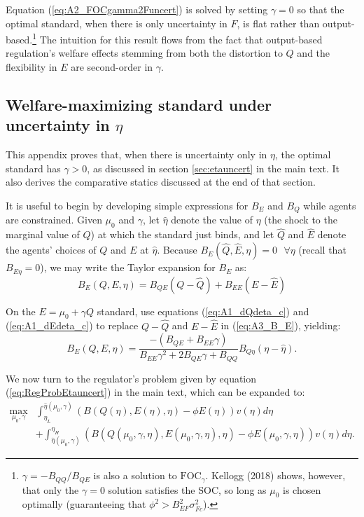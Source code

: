 \documentclass[12pt]{article}
\begin{document}
Equation (\ref{eq:A2_FOCgamma2Funcert}) is solved by setting $\gamma=0$ so that the optimal standard, when there is only uncertainty in $F$, is flat rather than output-based.\footnote{$\gamma=-B_{QQ}/B_{QE}$ is also a solution to $\text{FOC}_{\gamma}$. Kellogg (2018) shows, however, that only the $\gamma=0$ solution satisfies the SOC, so long as $\mu_0$ is chosen optimally (guaranteeing that $\phi^2>B_{EF}^2\sigma_{Fc}^2$).} The intuition for this result flows from the fact that output-based regulation's welfare effects stemming from both the distortion to $Q$ and the flexibility in $E$ are second-order in $\gamma$. 




\subsection{Welfare-maximizing standard under uncertainty in $\eta$} \label{appx:etauncert}

This appendix proves that, when there is uncertainty only in $\eta$, the optimal standard has $\gamma>0$, as discussed in section \ref{sec:etauncert} in the main text. It also derives the comparative statics discussed at the end of that section.

It is useful to begin by developing simple expressions for $B_E$ and $B_Q$ while agents are constrained. Given $\mu_0$ and $\gamma$, let $\hat{\eta}$ denote the value of $\eta$ (the shock to the marginal value of $Q$) at which the standard just binds, and let $\hat{Q}$ and $\hat{E}$ denote the agents' choices of $Q$ and $E$ at $\hat{\eta}$. Because $B_E(\hat{Q},\hat{E},\eta)=0 \text{ }\forall \eta$ (recall that $B_{E\eta}=0$), we may write the Taylor expansion for $B_E$ as:
\begin{equation}
B_E(Q,E,\eta)=B_{QE}(Q-\hat{Q})+B_{EE}(E-\hat{E}) \label{eq:A3_B_E}
\end{equation}

On the $E=\mu_0+\gamma Q$ standard, use equations (\ref{eq:A1_dQdeta_c}) and (\ref{eq:A1_dEdeta_c}) to replace $Q-\hat{Q}$ and $E-\hat{E}$ in (\ref{eq:A3_B_E}), yielding:
\begin{equation}
B_E(Q,E,\eta)=\frac{-(B_{QE}+B_{EE}\gamma)}{B_{EE}\gamma^2+2B_{QE}\gamma+B_{QQ}}B_{Q\eta}(\eta-\hat{\eta}). \label{eq:A3_B_E_long}
\end{equation}

We now turn to the regulator's problem given by equation (\ref{eq:RegProbEtauncert}) in the main text, which can be expanded to:
\begin{align}
\max_{\mu_0,\gamma} &\int_{\eta_L}^{\hat{\eta}(\mu_0,\gamma)}\left(B(Q(\eta),E(\eta),\eta)-\phi E(\eta)\right)v(\eta)d\eta \nonumber \\
&+ \int_{\hat{\eta}(\mu_0,\gamma)}^{\eta_H}\left(B(Q(\mu_0,\gamma,\eta),E(\mu_0,\gamma,\eta),\eta)-\phi E(\mu_0,\gamma,\eta)\right)v(\eta)d\eta. \label{eq:A3_RegProbEtauncert}
\end{align}
\end{document}
